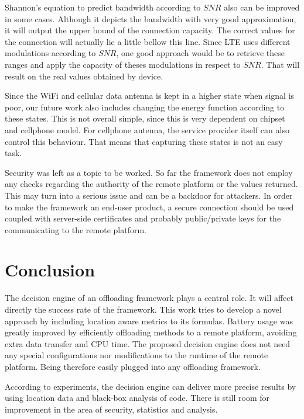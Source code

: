 \documentclass[10pt, conference, letterpaper]{IEEEtran}
\begin{document}
  Shannon's equation to predict bandwidth according to $SNR$ also can be improved in some cases. Although it depicts the bandwidth with very good approximation, it will output the upper bound of the connection capacity. The correct values for the connection will actually lie a little bellow this line. Since LTE uses different modulations according to $SNR$, one good approach would be to retrieve these ranges and apply the capacity of theses modulations in respect to $SNR$. That will result on the real values obtained by device.

  Since the WiFi and cellular data antenna is kept in a higher state when signal is poor, our future work also includes changing the energy function according to these states. This is not overall simple, since this is very dependent on chipset and cellphone model. For cellphone antenna, the service provider itself can also control this behaviour. That means that capturing these states is not an easy task.

  Security was left as a topic to be worked. So far the framework does not employ any checks regarding the authority of the remote platform or the values returned. This may turn into a serious issue and can be a backdoor for attackers. In order to make the framework an end-user product, a secure connection should be used coupled with server-side certificates and probably public/private keys for the communicating to the remote platform.

  \section{Conclusion}

  The decision engine of an offloading framework plays a central role. It will affect directly the success rate of the framework. This work tries to develop a novel approach by including location aware metrics to its formulas. Battery usage was greatly improved by efficiently offloading methods to a remote platform, avoiding extra data transfer and CPU time. The proposed decision engine does not need any special configurations nor modifications to the runtime of the remote platform. Being therefore easily plugged into any offloading framework.

  According to experiments, the decision engine can deliver more precise results by using location data and black-box analysis of code. There is still room for improvement in the area of security, statistics and analysis.





\end{document}
